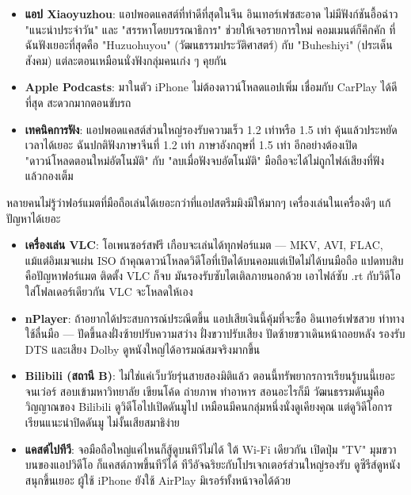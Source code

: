 \begin{itemize}
  \item \textbf{แอป Xiaoyuzhou}: แอปพอดแคสต์ที่ทำดีที่สุดในจีน อินเทอร์เฟซสะอาด ไม่มีฟังก์ชันอื้อฉ่าว "แนะนำประจำวัน" และ "สรรหาโดยบรรณาธิการ" ช่วยให้เจอรายการใหม่ คอมเมนต์ก็คึกคัก ที่ฉันฟังเยอะที่สุดคือ "Huzuohuyou" (วัฒนธรรมประวัติศาสตร์) กับ "Buheshiyi" (ประเด็นสังคม) แต่ละตอนเหมือนนั่งฟังกลุ่มคนเก่ง ๆ คุยกัน
  \item \textbf{Apple Podcasts}: มาในตัว iPhone ไม่ต้องดาวน์โหลดแอปเพิ่ม เชื่อมกับ CarPlay ได้ดีที่สุด สะดวกมากตอนขับรถ
  \item \textbf{เทคนิคการฟัง}: แอปพอดแคสต์ส่วนใหญ่รองรับความเร็ว 1.2 เท่าหรือ 1.5 เท่า คุ้นแล้วประหยัดเวลาได้เยอะ ฉันปกติฟังภาษาจีนที่ 1.2 เท่า ภาษาอังกฤษที่ 1.5 เท่า อีกอย่างต้องเปิด "ดาวน์โหลดตอนใหม่อัตโนมัติ" กับ "ลบเมื่อฟังจบอัตโนมัติ" มือถือจะได้ไม่ถูกไฟล์เสียงที่ฟังแล้วกองเต็ม
\end{itemize}


หลายคนไม่รู้ว่าฟอร์แมตที่มือถือเล่นได้เยอะกว่าที่แอปสตรีมมิงมีให้มากๆ เครื่องเล่นในเครื่องดีๆ แก้ปัญหาได้เยอะ

\begin{itemize}
  \item \textbf{เครื่องเล่น VLC}: โอเพนซอร์สฟรี เกือบจะเล่นได้ทุกฟอร์แมต — MKV, AVI, FLAC, แม้แต่อิมเมจแผ่น ISO ถ้าคุณดาวน์โหลดวิดีโอที่เปิดได้บนคอมแต่เปิดไม่ได้บนมือถือ แปดทบสิบคือปัญหาฟอร์แมต ติดตั้ง VLC ก็จบ มันรองรับซับไตเติลภายนอกด้วย เอาไฟล์ซับ .rt กับวิดีโอใส่โฟลเดอร์เดียวกัน VLC จะโหลดให้เอง
  \item \textbf{nPlayer}: ถ้าอยากได้ประสบการณ์ประณีตขึ้น แอปเสียเงินนี้คุ้มที่จะซื้อ อินเทอร์เฟซสวย ท่าทางใช้ลื่นมือ — ปัดขึ้นลงฝั่งซ้ายปรับความสว่าง ฝั่งขวาปรับเสียง ปัดซ้ายขวาเดินหน้าถอยหลัง รองรับ DTS และเสียง Dolby ดูหนังใหญ่ได้อารมณ์สมจริงมากขึ้น
  \item \textbf{Bilibili (สถานี B)}: ไม่ใช่แค่เว็บวัยรุ่นสายสองมิติแล้ว ตอนนี้ทรัพยากรการเรียนรู้บนนี้เยอะจนเว่อร์ สอบเข้ามหาวิทยาลัย เขียนโค้ด ถ่ายภาพ ทำอาหาร สอนอะไรก็มี วัฒนธรรมดันมูคือวิญญาณของ Bilibili ดูวิดีโอไปเปิดดันมูไป เหมือนมีคนกลุ่มหนึ่งนั่งดูเคียงคุณ แต่ดูวิดีโอการเรียนแนะนำปิดดันมู ไม่งั้นเสียสมาธิง่าย
  \item \textbf{แคสต์ไปทีวี}: จอมือถือใหญ่แค่ไหนก็สู้ดูบนทีวีไม่ได้ ใต้ Wi-Fi เดียวกัน เปิดปุ่ม "TV" มุมขวาบนของแอปวิดีโอ ก็แคสต์ภาพขึ้นทีวีได้ ทีวีอัจฉริยะกับโปรเจกเตอร์ส่วนใหญ่รองรับ ดูซีรีส์ดูหนังสนุกขึ้นเยอะ ผู้ใช้ iPhone ยังใช้ AirPlay มิเรอร์ทั้งหน้าจอได้ด้วย
\end{itemize}

